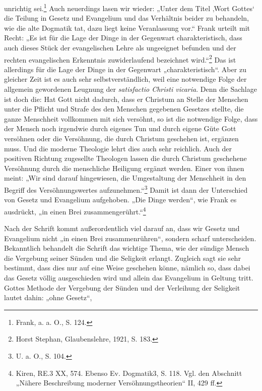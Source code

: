 \setcounter{page}{85}
unrichtig sei.\footnote{Frank, a. a. O., S. 124.} Auch neuerdings lasen wir wieder: „Unter dem Titel ‚Wort Gottes‘ die Teilung in Gesetz und Evangelium und das Verhältnis beider zu behandeln, wie die alte Dogmatik tat, dazu liegt keine Veranlassung vor.“ Frank urteilt mit Recht: „Es ist für die Lage der Dinge in der Gegenwart charakteristisch, dass auch dieses Stück der evangelischen Lehre als ungeeignet befunden und der rechten evangelischen Erkenntnis zuwiderlaufend bezeichnet wird.“\footnote{Horst Stephan, Glaubenslehre, 1921, S. 183.} Das ist allerdings für die Lage der Dinge in der Gegenwart „charakteristisch“. Aber zu gleicher Zeit ist es auch sehr selbstverständlich, weil eine notwendige Folge der allgemein gewordenen Leugnung der \textit{satisfactio Christi vicaria}. Denn die Sachlage ist doch die: Hat Gott nicht dadurch, dass er Christum an Stelle der Menschen unter die Pflicht und Strafe des den Menschen gegebenen Gesetzes stellte, die ganze Menschheit vollkommen mit sich versöhnt, so ist die notwendige Folge, dass der Mensch noch irgendwie durch eigenes Tun und durch eigene Güte Gott versöhnen oder die Versöhnung, die durch Christum geschehen ist, ergänzen muss. Und die moderne Theologie lehrt dies auch sehr reichlich. Auch der positiven Richtung zugesellte Theologen lassen die durch Christum geschehene Versöhnung durch die menschliche Heiligung ergänzt werden. Einer von ihnen meint: „Wir sind darauf hingewiesen, die Umgestaltung der Menschheit in den Begriff des Versöhnungswertes aufzunehmen.“\footnote{U. a. O., S. 104.} Damit ist dann der Unterschied von Gesetz und Evangelium aufgehoben. „Die Dinge werden“, wie Frank es ausdrückt, „in einen Brei zusammengerührt.“\footnote{Kiren, RE.3 XX, 574. Ebenso Ev. Dogmatik3, S. 118. Vgl. den Abschnitt „Nähere Beschreibung moderner Versöhnungstheorien“ II, 429 ff.}

Nach der Schrift kommt außerordentlich viel darauf an, dass wir Gesetz und Evangelium nicht „in einen Brei zusammenrühren“, sondern scharf unterscheiden. Bekanntlich behandelt die Schrift das wichtige Thema, wie der sündige Mensch die Vergebung seiner Sünden und die Seligkeit erlangt. Zugleich sagt sie sehr bestimmt, dass dies nur auf eine Weise geschehen könne, nämlich so, dass dabei das Gesetz völlig ausgeschieden wird und allein das Evangelium in Geltung tritt. Gottes Methode der Vergebung der Sünden und der Verleihung der Seligkeit lautet dahin: „ohne Gesetz“,